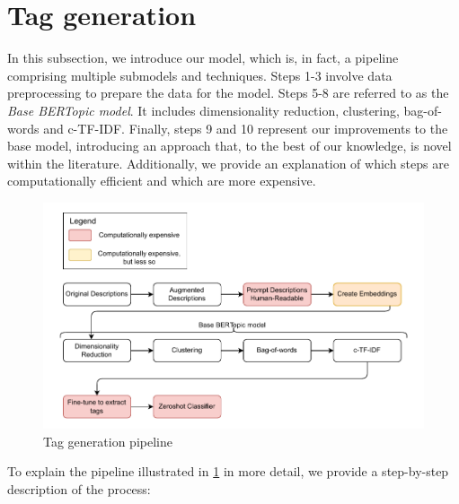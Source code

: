 \section{Tag generation}
In this subsection, we introduce our model, which is, in fact, a pipeline comprising multiple submodels and techniques. Steps 1-3 involve data preprocessing to prepare the data for the model. Steps 5-8 are referred to as the \textit{Base BERTopic model}. It includes dimensionality reduction, clustering, bag-of-words and c-TF-IDF. Finally, steps 9 and 10 represent our improvements to the base model, introducing an approach that, to the best of our knowledge, is novel within the literature. Additionally, we provide an explanation of which steps are computationally efficient and which are more expensive.

\begin{figure}[h]
    \centering
    \includegraphics[width=\textwidth]{figures/tag_generation_pipeline.pdf}
    \caption{Tag generation pipeline}
    \label{fig:tag_generation_pipeline}
\end{figure}

To explain the pipeline illustrated in \cref{fig:tag_generation_pipeline} in more detail, we provide a step-by-step description of the process:

